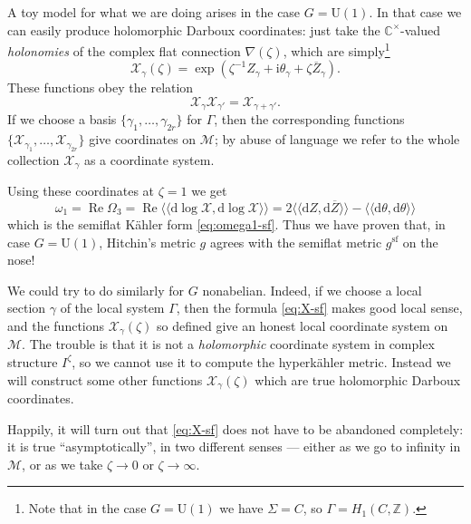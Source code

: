 \documentclass[12pt,letterpaper,reqno]{article}
\numberwithin{equation}{section}
\newcommand{\cM}{\ensuremath{\mathcal M}}
\newcommand{\cX}{\ensuremath{\mathcal X}}
\newcommand{\bbZ}{\ensuremath{\mathbb Z}}
\newcommand{\bbC}{\ensuremath{\mathbb C}}
\newcommand{\kahler}{K\"ahler\xspace}
\newcommand{\hk}{hyperk\"ahler\xspace}
\newcommand{\I}{{\mathrm i}}
\newcommand{\de}{\mathrm{d}}
\renewcommand{\sf}{\mathrm{sf}}
\newcommand{\DIP}[1]{\langle\!\langle#1\rangle\!\rangle}
\newcommand{\ti}[1]{\textit{#1}}
\DeclareMathOperator{\re}{Re}
\newcommand{\U}{\mathrm{U}}
\begin{document}
\begin{remark}[The case of $G = \U(1)$]
A toy model for what we are doing arises in the
case $G = \U(1)$. In that case we can easily produce holomorphic Darboux coordinates: 
just take the $\bbC^\times$-valued \ti{holonomies} of the 
complex flat connection $\nabla(\zeta)$, which are simply\footnote{Note that in the case
$G = \U(1)$ we have $\Sigma = C$, so $\Gamma = H_1(C,\bbZ)$.}
\begin{equation} \label{eq:X-sf}
  \cX_\gamma(\zeta) = \exp \left( \zeta^{-1} Z_\gamma + \I \theta_\gamma + \zeta \overline{Z}_\gamma \right).
\end{equation}
These functions obey the relation
\begin{equation}
	\cX_{\gamma} \cX_{\gamma'} = \cX_{\gamma + \gamma'}.
\end{equation}
If we choose a basis $\{\gamma_1, \dots, \gamma_{2r}\}$
for $\Gamma$, then the corresponding functions
$\{\cX_{\gamma_1}, \dots, \cX_{\gamma_{2r}}\}$
give coordinates on $\cM$; by abuse of
language we refer to the whole collection 
$\cX_\gamma$ as a coordinate system.

Using these coordinates at $\zeta = 1$ we get
\begin{equation}
 \omega_1 = \re \Omega_3 = \re \DIP{\de \log \cX, \de \log \cX} = 2 \DIP{\de Z, \de \overline{Z}} - \DIP{\de \theta, \de \theta}
\end{equation}
which is the semiflat \kahler form \eqref{eq:omega1-sf}.
Thus we have proven that, in case $G = \U(1)$, Hitchin's metric $g$ agrees
with the semiflat metric $g^\sf$ on the nose!
\end{remark}

We could try to do similarly for $G$ nonabelian.
Indeed, if we choose a local section $\gamma$ of the local
system $\Gamma$, then 
the formula \eqref{eq:X-sf} makes good local sense,
and the functions $\cX_\gamma(\zeta)$ so defined 
give an honest local coordinate system
on $\cM$. The trouble is that it is not a \ti{holomorphic}
coordinate system in complex structure $I^\zeta$, so we 
cannot use it to compute the \hk metric.
Instead we will construct some
other functions $\cX_\gamma(\zeta)$ which are true 
holomorphic Darboux coordinates. 

Happily, it will turn out 
that \eqref{eq:X-sf} does not have to be abandoned completely:
it is true ``asymptotically'', in two different senses --- 
either as we go
to infinity in $\cM$, or as we take $\zeta \to 0$ or
$\zeta \to \infty$.
\end{document}
